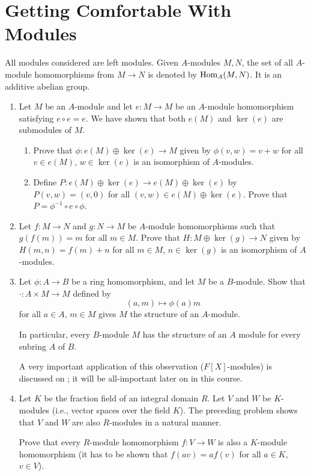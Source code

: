 \documentclass[../psets.tex]{subfiles}
\begin{document}
\section{Getting Comfortable With Modules}
All modules considered are left modules. Given $A$-modules $M,N$, the set of all $A$-module homomorphisms from $M\to N$ is denoted by $\operatorname{Hom}_A(M,N)$. It is an additive abelian group.
\begin{enumerate}
    \item {}Let $M$ be an $A$-module and let $e:M\to M$ be an $A$-module homomorphism satisfying $e\circ e=e$. We have shown that both $e(M)$ and $\ker(e)$ are submodules of $M$. %
    \begin{enumerate}
        \item Prove that $\phi:e(M)\oplus\ker(e)\to M$ given by $\phi(v,w)=v+w$ for all $v\in e(M)$, $w\in\ker(e)$ is an isomorphism of $A$-modules.
        \item Define $P:e(M)\oplus\ker(e)\to e(M)\oplus\ker(e)$ by $P(v,w)=(v,0)$ for all $(v,w)\in e(M)\oplus\ker(e)$. Prove that $P=\phi^{-1}\circ e\circ\phi$.
    \end{enumerate}
    \item Let $f:M\to N$ and $g:N\to M$ be $A$-module homomorphisms such that $g(f(m))=m$ for all $m\in M$. Prove that $H:M\oplus\ker(g)\to N$ given by $H(m,n)=f(m)+n$ for all $m\in M$, $n\in\ker(g)$ is an isomorphism of $A$-modules.
    \item Let $\phi:A\to B$ be a ring homomorphism, and let $M$ be a $B$-module. Show that $\cdot:A\times M\to M$ defined by
    \begin{equation*}
        (a,m) \mapsto \phi(a)m
    \end{equation*}
    for all $a\in A$, $m\in M$ gives $M$ the structure of an $A$-module.\par
    In particular, every $B$-module $M$ has the structure of an $A$ module for every subring $A$ of $B$.\par
    A very important application of this observation ($F[X]$-modules) is discussed on \textcite[340]{bib:DummitFoote}; it will be all-important later on in this course. %
    \item Let $K$ be the fraction field of an integral domain $R$. Let $V$ and $W$ be $K$-modules (i.e., vector spaces over the field $K$). The preceding problem shows that $V$ and $W$ are also $R$-modules in a natural manner.\par
    Prove that every $R$-module homomorphism $f:V\to W$ is also a $K$-module homomorphism (it has to be shown that $f(av)=af(v)$ for all $a\in K$, $v\in V$).

\end{enumerate}
\end{document}
